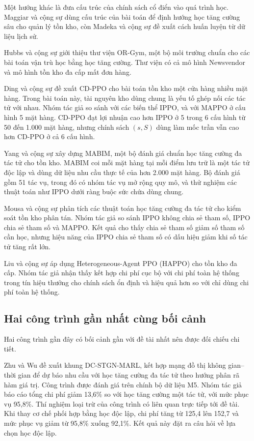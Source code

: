 Một hướng khác là đưa cấu trúc của chính sách cổ điển vào quá trình học. Maggiar và cộng sự \cite{maggiar2025} dùng cấu trúc của bài toán để định hướng học tăng cường sâu cho quản lý tồn kho, còn Madeka và cộng sự \cite{madeka2022} đề xuất cách huấn luyện từ dữ liệu lịch sử.

Hubbs và cộng sự \cite{hubbs2020orgym} giới thiệu thư viện OR-Gym, một bộ môi trường chuẩn cho các bài toán vận trù học bằng học tăng cường. Thư viện có cả mô hình Newsvendor và mô hình tồn kho đa cấp mất đơn hàng.

Ding và cộng sự \cite{ding2022cdppo} đề xuất CD-PPO cho bài toán tồn kho một cửa hàng nhiều mặt hàng. Trong bài toán này, tài nguyên kho dùng chung là yếu tố ghép nối các tác tử với nhau. Nhóm tác giả so sánh với các biến thể IPPO, và với MAPPO ở cấu hình 5 mặt hàng. CD-PPO đạt lợi nhuận cao hơn IPPO ở 5 trong 6 cấu hình từ 50 đến 1.000 mặt hàng, nhưng chính sách $(s,S)$ dùng làm mốc trần vẫn cao hơn CD-PPO ở cả 6 cấu hình.

Yang và cộng sự \cite{yang2023mabim} xây dựng MABIM, một bộ đánh giá chuẩn học tăng cường đa tác tử cho tồn kho. MABIM coi mỗi mặt hàng tại mỗi điểm lưu trữ là một tác tử độc lập và dùng dữ liệu nhu cầu thực tế của hơn 2.000 mặt hàng. Bộ đánh giá gồm 51 tác vụ, trong đó có nhóm tác vụ mở rộng quy mô, và thử nghiệm các thuật toán như IPPO dưới ràng buộc sức chứa dùng chung.

Mousa và cộng sự \cite{kotecha2024decentralized} phân tích các thuật toán học tăng cường đa tác tử cho kiểm soát tồn kho phân tán. Nhóm tác giả so sánh IPPO không chia sẻ tham số, IPPO chia sẻ tham số và MAPPO. Kết quả cho thấy chia sẻ tham số giảm số tham số cần học, nhưng hiệu năng của IPPO chia sẻ tham số có dấu hiệu giảm khi số tác tử tăng rất lớn.

Liu và cộng sự \cite{liu2025happo} áp dụng Heterogeneous-Agent PPO (HAPPO) cho tồn kho đa cấp. Nhóm tác giả nhận thấy kết hợp chi phí cục bộ với chi phí toàn hệ thống trong tín hiệu thưởng cho chính sách ổn định và hiệu quả hơn so với chỉ dùng chi phí toàn hệ thống.

\subsection{Hai công trình gần nhất cùng bối cảnh}
\label{subsec:congTrinhGanNhat}

Hai công trình gần đây có bối cảnh gần với đề tài nhất nên được đối chiếu chi tiết.

Zhu và Wu \cite{zhu2026spatiotemporal} đề xuất khung DC-STGN-MARL, kết hợp mạng đồ thị không gian--thời gian để dự báo nhu cầu với học tăng cường đa tác tử theo hướng phân rã hàm giá trị. Công trình được đánh giá trên chính bộ dữ liệu M5. Nhóm tác giả báo cáo tổng chi phí giảm 13,6\% so với học tăng cường một tác tử, với mức phục vụ 95,8\%. Thí nghiệm loại trừ của công trình có liên quan trực tiếp tới đề tài. Khi thay cơ chế phối hợp bằng học độc lập, chi phí tăng từ 125,4 lên 152,7 và mức phục vụ giảm từ 95,8\% xuống 92,1\%. Kết quả này đặt ra câu hỏi về lựa chọn học độc lập.

